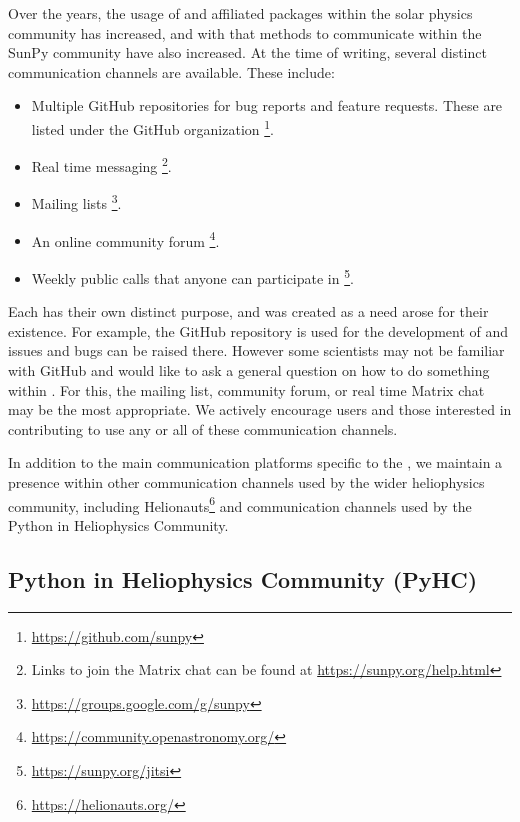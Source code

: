 Over the years, the usage of \sunpypkg and affiliated packages within the solar physics community has increased, and with that methods to communicate within the SunPy community have also increased.
At the time of writing, several distinct communication channels are available.
These include:

\begin{itemize}
    \item Multiple GitHub repositories for bug reports and feature requests.
          These are listed under the \sunpyproj GitHub organization \footnote{\url{https://github.com/sunpy}}.
    \item Real time messaging \footnote{Links to join the Matrix chat can be found at \url{https://sunpy.org/help.html}}.
    \item Mailing lists \footnote{\url{https://groups.google.com/g/sunpy}}.
    \item An online community forum \footnote{\url{https://community.openastronomy.org/}}.
    \item Weekly public calls that anyone can participate in \footnote{\url{https://sunpy.org/jitsi}}.
\end{itemize}

Each has their own distinct purpose, and was created as a need arose for their existence.
For example, the GitHub repository is used for the development of \sunpypkg and issues and bugs can be raised there.
However some scientists may not be familiar with GitHub and would like to ask a general question on how to do something within \sunpypkg.
For this, the mailing list, community forum, or real time Matrix chat may be the most appropriate.
We actively encourage users and those interested in contributing to use any or all of these communication channels.

In addition to the main communication platforms specific to the \sunpyproj, we maintain a presence within other communication channels used by the wider heliophysics community, including Helionauts\footnote{\url{https://helionauts.org/}} and communication channels used by the Python in Heliophysics Community.

\subsection{Python in Heliophysics Community (PyHC)}
\label{ssec:python-in-heliophysics-community-pyhc}

